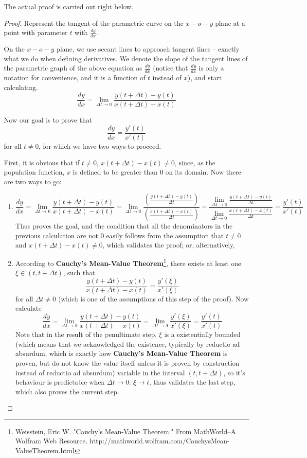 \documentclass{article}
\begin{document}
The actual proof is carried out right below.\pagebreak
\begin{proof}
Represent the tangent of the parametric curve on the $x-o-y$ plane at a point with parameter $t$ with $\displaystyle{\frac{dy}{dx}}$.

On the $x-o-y$ plane, we use secant lines to approach tangent lines -- exactly what we do when defining derivatives. We denote the slope of the tangent lines of the parametric graph of the above equation as $\displaystyle{\frac{dy}{dx}}$ (notice that $\displaystyle{\frac{dy}{dx}}$ is only a notation for convenience, and it is a function of $t$ instead of $x$), and start calculating.
$$
\frac{dy}{dx}=\lim_{\Delta t\to0}\frac{y(t+\Delta t)-y(t)}{x(t+\Delta t)-x(t)}
$$

Now our goal is to prove that
$$
\frac{dy}{dx}=\frac{y'(t)}{x'(t)}
$$
for all $t\neq0$, for which we have two ways to proceed.

First, it is obvious that if $t\neq0$, $x(t+\Delta t)-x(t)\neq0$, since, as the population function, $x$ is defined to be greater than 0 on its domain. Now there are two ways to go:
\begin{enumerate}
\item
$$
\frac{dy}{dx}=\lim_{\Delta t\to0}\frac{y(t+\Delta t)-y(t)}{x(t+\Delta t)-x(t)}=\lim_{\Delta t\to0}\frac{\left(\frac{y(t+\Delta t)-y(t)}{\Delta t}\right)}{\left(\frac{x(t+\Delta t)-x(t)}{\Delta t}\right)}=\frac{\displaystyle{\lim_{\Delta t\to0}}\frac{y(t+\Delta t)-y(t)}{\Delta t}}{\displaystyle{\lim_{\Delta t\to0}}\frac{x(t+\Delta t)-x(t)}{\Delta t}}=\frac{y'(t)}{x'(t)}
$$
Thus proves the goal, and the condition that all the denominators in the previous calculation are not $0$ easily follows from the assumption that $t\neq0$ and $x(t+\Delta t)-x(t)\neq0$, which validates the proof; or, alternatively,
\item
According to \textbf{Cauchy's Mean-Value Theorem}\footnote{Weisstein, Eric W. "Cauchy's Mean-Value Theorem." From MathWorld--A Wolfram Web Resource. http://mathworld.wolfram.com/CauchysMean-ValueTheorem.html}, there exists at least one $\xi\in(t,t+\Delta t)$, such that
$$
\frac{y(t+\Delta t)-y(t)}{x(t+\Delta t)-x(t)}=\frac{y'(\xi)}{x'(\xi)}
$$
for all $\Delta t\neq0$ (which is one of the assumptions of this step of the proof). Now calculate
$$
\frac{dy}{dx}=\lim_{\Delta t\to0}\frac{y(t+\Delta t)-y(t)}{x(t+\Delta t)-x(t)}=\lim_{\Delta t\to0}\frac{y'(\xi)}{x'(\xi)}=\frac{y'(t)}{x'(t)}
$$
Note that in the result of the penultimate step, $\xi$ is a existentially bounded (which means that we acknowledged the existence, typically by reductio ad absurdum, which is exactly how \textbf{Cauchy's Mean-Value Theorem} is proven, but do not know the value itself unless it is proven by construction instead of reductio ad absurdum) variable in the interval $(t,t+\Delta t)$, so it's behaviour is predictable when $\Delta t\to0$: $\xi\to t$, thus validates the last step, which also proves the current step.
\end{enumerate}


\end{proof}
\end{document}
